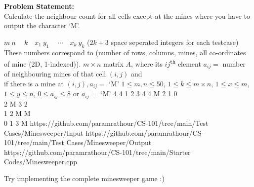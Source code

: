 \textbf{Problem Statement:}\\
Calculate the neighbour count for all cells except at the mines where you have to output the character `M'.%
\begin{testcasesMore}
	{%
	$m\ n\ \quad k\quad x_1\ y_1\ \quad\cdots\quad x_{k}\ y_{k}$ \hfill($2k+3$ space seperated integers for each testcase)\\
	These numbers correspond to (number of rows, columns, mines, all co-ordinates of mine (2D, 1-indexed)).}
	{$m\times n$ matrix $A$, where its $ij$\textsuperscript{th} element $a_{ij}=$ number of neighbouring mines of that cell $(i,j)$ and\\ if there is a mine at $(i,j), a_{ij}=$ `M'}
	{$1 \leq m,n \leq 50$, $1 \leq k \leq m\times n$, $1 \leq x \leq m$, $1 \leq y \leq n$, $0 \leq a_{ij} \leq 8$ or $a_{ij}=$ `M' }%
	{4 4  1  2  3 4 4}
	{M 2 1 0\\	2 M 3 2 \\	1 2 M M \\	0 1 3 M}
	{https://github.com/paramrathour/CS-101/tree/main/Test Cases/Minesweeper/Input}
	{https://github.com/paramrathour/CS-101/tree/main/Test Cases/Minesweeper/Output}
	{https://github.com/paramrathour/CS-101/tree/main/Starter Codes/Minesweeper.cpp}
\end{testcasesMore}
\begin{note}
	Try implementing the complete minesweeper game :)
\end{note}